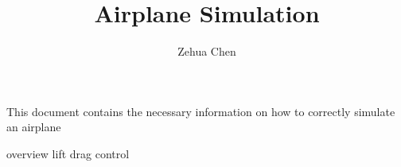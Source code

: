 \documentclass[11pt, letterpaper]{article}
\title{Airplane Simulation}
\author{Zehua Chen}
\begin{document}
  \maketitle
  \tableofcontents

  \setmainstyles
  \vfill
  This document contains the necessary information on how to correctly simulate
  an airplane

  \newpage
  \tableofcontents

  \newpage
  {overview}
  {lift}
  {drag}
  {control}
\end{document}
